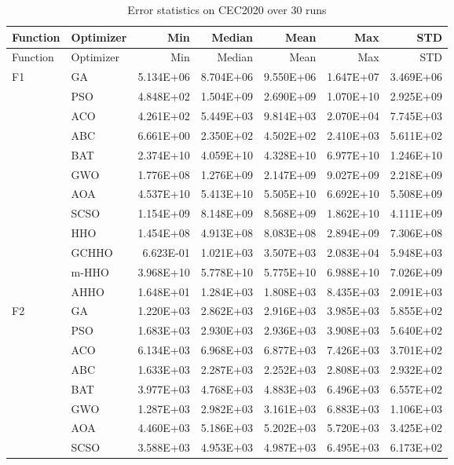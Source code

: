\begin{longtable}{llrrrrr}
\caption{Error statistics on CEC2020 over 30 runs}\label{tab:cec2020-desc}\\
\toprule
Function & Optimizer & Min & Median & Mean & Max & STD \\
\midrule
\endfirsthead
\toprule
Function & Optimizer & Min & Median & Mean & Max & STD \\
\midrule
\endhead
\bottomrule
\endfoot
F1 & GA & 5.134E+06 & 8.704E+06 & 9.550E+06 & 1.647E+07 & 3.469E+06 \\
 & PSO & 4.848E+02 & 1.504E+09 & 2.690E+09 & 1.070E+10 & 2.925E+09 \\
 & ACO & 4.261E+02 & 5.449E+03 & 9.814E+03 & 2.070E+04 & 7.745E+03 \\
 & ABC & 6.661E+00 & 2.350E+02 & 4.502E+02 & 2.410E+03 & 5.611E+02 \\
 & BAT & 2.374E+10 & 4.059E+10 & 4.328E+10 & 6.977E+10 & 1.246E+10 \\
 & GWO & 1.776E+08 & 1.276E+09 & 2.147E+09 & 9.027E+09 & 2.218E+09 \\
 & AOA & 4.537E+10 & 5.413E+10 & 5.505E+10 & 6.692E+10 & 5.508E+09 \\
 & SCSO & 1.154E+09 & 8.148E+09 & 8.568E+09 & 1.862E+10 & 4.111E+09 \\
 & HHO & 1.454E+08 & 4.913E+08 & 8.083E+08 & 2.894E+09 & 7.306E+08 \\
 & GCHHO & 6.623E-01 & 1.021E+03 & 3.507E+03 & 2.083E+04 & 5.948E+03 \\
 & m-HHO & 3.968E+10 & 5.778E+10 & 5.775E+10 & 6.988E+10 & 7.026E+09 \\
 & AHHO & 1.648E+01 & 1.284E+03 & 1.808E+03 & 8.435E+03 & 2.091E+03 \\
\addlinespace
F2 & GA & 1.220E+03 & 2.862E+03 & 2.916E+03 & 3.985E+03 & 5.855E+02 \\
 & PSO & 1.683E+03 & 2.930E+03 & 2.936E+03 & 3.908E+03 & 5.640E+02 \\
 & ACO & 6.134E+03 & 6.968E+03 & 6.877E+03 & 7.426E+03 & 3.701E+02 \\
 & ABC & 1.633E+03 & 2.287E+03 & 2.252E+03 & 2.808E+03 & 2.932E+02 \\
 & BAT & 3.977E+03 & 4.768E+03 & 4.883E+03 & 6.496E+03 & 6.557E+02 \\
 & GWO & 1.287E+03 & 2.982E+03 & 3.161E+03 & 6.883E+03 & 1.106E+03 \\
 & AOA & 4.460E+03 & 5.186E+03 & 5.202E+03 & 5.720E+03 & 3.425E+02 \\
 & SCSO & 3.588E+03 & 4.953E+03 & 4.987E+03 & 6.495E+03 & 6.173E+02 \\

\end{longtable}
